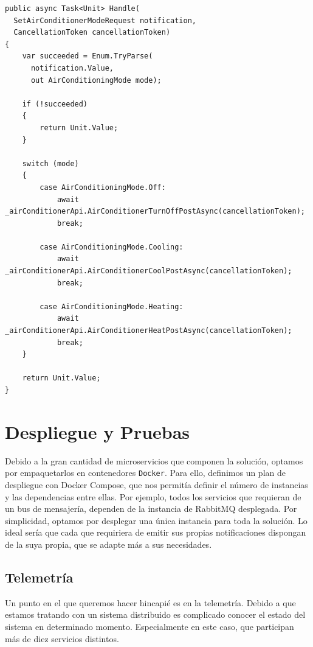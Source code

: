 \begin{lstlisting}[language={[Sharp]C},caption={Implementación de los efectores del aire acondicionado. Invocan a los endpoints HTTP en base a las acciones de adaptación.},captionpos=b, label=ls:effector-airconditioner-set-parameter]
public async Task<Unit> Handle(
  SetAirConditionerModeRequest notification,
  CancellationToken cancellationToken)
{
    var succeeded = Enum.TryParse(
      notification.Value,
      out AirConditioningMode mode);

    if (!succeeded)
    {
        return Unit.Value;
    }

    switch (mode)
    {
        case AirConditioningMode.Off:
            await _airConditionerApi.AirConditionerTurnOffPostAsync(cancellationToken);
            break;

        case AirConditioningMode.Cooling:
            await _airConditionerApi.AirConditionerCoolPostAsync(cancellationToken);
            break;

        case AirConditioningMode.Heating:
            await _airConditionerApi.AirConditionerHeatPostAsync(cancellationToken);
            break;
    }

    return Unit.Value;
}
\end{lstlisting}

\section{Despliegue y Pruebas}

Debido a la gran cantidad de microservicios que componen la solución, optamos por empaquetarlos en contenedores \texttt{Docker}. Para ello, definimos un plan de despliegue con Docker Compose, que nos permitía definir el número de instancias y las dependencias entre ellas. Por ejemplo, todos los servicios que requieran de un bus de mensajería, dependen de la instancia de RabbitMQ desplegada. Por simplicidad, optamos por desplegar una única instancia para toda la solución. Lo ideal sería que cada que requiriera de emitir sus propias notificaciones dispongan de la suya propia, que se adapte más a sus necesidades.

\subsection{Telemetría}

Un punto en el que queremos hacer hincapié es en la telemetría. Debido a que estamos tratando con un sistema distribuido es complicado conocer el estado del sistema en determinado momento. Especialmente en este caso, que participan más de diez servicios distintos.

